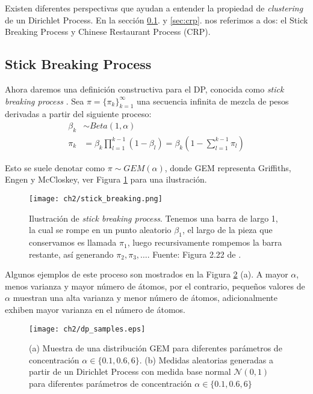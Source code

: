 \documentclass[letterpaper,12pt,oneside]{book} %
\begin{document}
Existen diferentes perspectivas que ayudan a entender la propiedad de \textit{clustering} de un Dirichlet Process. En la sección \ref{sec:sbp}. y \ref{sec:crp}. nos referimos a dos: el Stick Breaking Process y Chinese Restaurant Process (CRP).

\subsection{Stick Breaking Process}
\label{sec:sbp}

Ahora daremos una definición constructiva para el DP, conocida como \textit{stick breaking process} \citep{sethuraman1994constructive}. Sea $\pi=\{\pi_{k}\}_{k=1}^{\infty}$ una secuencia infinita de mezcla de pesos derivadas a partir del siguiente proceso:
\begin{align}
    \beta_{k} & \sim Beta(1, \alpha)\\
    \pi_{k} & = \beta_{k}\prod_{l=1}^{k-1}(1-\beta_{l}) = \beta_{k}(1-\sum_{l=1}^{k-1}\pi_{l})
\end{align}

Esto se suele denotar como $\pi \sim GEM(\alpha)$, donde GEM representa Griffiths, Engen y McCloskey, ver Figura  \ref{img:stick_breaking} para una ilustración. 

\begin{figure}
    \centering
    \texttt{[image: ch2/stick\_breaking.png]}
    \caption{Ilustración de \textit{stick breaking process}. Tenemos una barra de largo 1, la cual se rompe en un punto aleatorio $\beta_{1}$, el largo de la pieza que conservamos es llamada $\pi_{1}$, luego recursivamente rompemos la barra restante, así generando $\pi_{2}, \pi_{3}, \ldots$. Fuente: Figura 2.22 de \citep{sudderth2006graphical}.}
    \label{img:stick_breaking}
\end{figure}

Algunos ejemplos de este proceso son mostrados en la Figura \ref{img:dp_samples} (a). A mayor $\alpha$, menos varianza y mayor número de átomos, por el contrario, pequeños valores de $\alpha$ muestran una alta varianza y menor número de átomos, adicionalmente exhiben mayor varianza en el número de átomos.

\begin{figure}
    \centering
    \texttt{[image: ch2/dp\_samples.eps]}
    \caption{(a) Muestra de una distribución GEM para diferentes parámetros de concentración $\alpha\in \{0.1, 0.6, 6\}$. (b) Medidas aleatorias generadas a partir de un Dirichlet Process con medida base normal $\mathcal{N}(0,1)$ para diferentes parámetros de concentración $\alpha\in \{0.1, 0.6, 6\}$}
    \label{img:dp_samples}
\end{figure}
\end{document}
